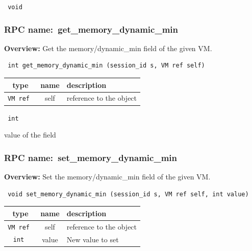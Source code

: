 \vspace{0.3cm}

{\tt 
void
}



\vspace{0.3cm}
\vspace{0.3cm}
\vspace{0.3cm}
\subsubsection{RPC name:~get\_memory\_dynamic\_min}

{\bf Overview:} 
Get the memory/dynamic\_min field of the given VM.

\begin{verbatim} int get_memory_dynamic_min (session_id s, VM ref self)\end{verbatim}



 
\vspace{0.3cm}
\begin{tabular}{|c|c|p{7cm}|}
 \hline
{\bf type} & {\bf name} & {\bf description} \\ \hline
{\tt VM ref } & self & reference to the object \\ \hline 

\end{tabular}

\vspace{0.3cm}

{\tt 
int
}


value of the field
\vspace{0.3cm}
\vspace{0.3cm}
\vspace{0.3cm}
\subsubsection{RPC name:~set\_memory\_dynamic\_min}

{\bf Overview:} 
Set the memory/dynamic\_min field of the given VM.

\begin{verbatim} void set_memory_dynamic_min (session_id s, VM ref self, int value)\end{verbatim}



 
\vspace{0.3cm}
\begin{tabular}{|c|c|p{7cm}|}
 \hline
{\bf type} & {\bf name} & {\bf description} \\ \hline
{\tt VM ref } & self & reference to the object \\ \hline 

{\tt int } & value & New value to set \\ \hline 

\end{tabular}

